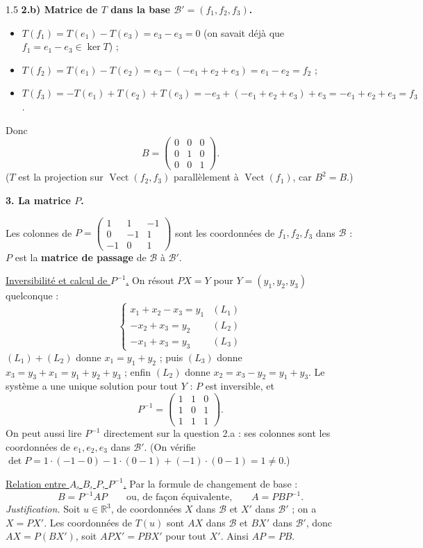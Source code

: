 \documentclass[12pt]{article}
\begin{document}
\begin{spacing}{1.5}
\textbf{2.b) Matrice de $T$ dans la base $\mathcal{B}'=(f_1,f_2,f_3)$.}
\begin{itemize}
\item $T(f_1)=T(e_1)-T(e_3)=e_3-e_3=0$ (on savait déjà que $f_1=e_1-e_3\in\ker T$) ;
\item $T(f_2)=T(e_1)-T(e_2)=e_3-(-e_1+e_2+e_3)=e_1-e_2=f_2$ ;
\item $T(f_3)=-T(e_1)+T(e_2)+T(e_3)=-e_3+(-e_1+e_2+e_3)+e_3=-e_1+e_2+e_3=f_3$.
\end{itemize}
Donc
\[
B=\begin{pmatrix}
0 & 0 & 0 \\
0 & 1 & 0 \\
0 & 0 & 1
\end{pmatrix}.
\]
($T$ est la projection sur $\operatorname{Vect}(f_2,f_3)$ parallèlement à $\operatorname{Vect}(f_1)$, car $B^2=B$.)

\textbf{3. La matrice $P$.}

Les colonnes de $P=\begin{pmatrix}1&1&-1\\0&-1&1\\-1&0&1\end{pmatrix}$ sont les coordonnées de $f_1,f_2,f_3$ dans $\mathcal{B}$ : $P$ est la \textbf{matrice de passage} de $\mathcal{B}$ à $\mathcal{B}'$.

\underline{Inversibilité et calcul de $P^{-1}$.} On résout $PX=Y$ pour $Y=(y_1,y_2,y_3)$ quelconque :
\[
\begin{cases}
x_1+x_2-x_3=y_1 & (L_1)\\
-x_2+x_3=y_2 & (L_2)\\
-x_1+x_3=y_3 & (L_3)
\end{cases}
\]
$(L_1)+(L_2)$ donne $x_1=y_1+y_2$ ; puis $(L_3)$ donne $x_3=y_3+x_1=y_1+y_2+y_3$ ; enfin $(L_2)$ donne $x_2=x_3-y_2=y_1+y_3$. Le système a une unique solution pour tout $Y$ : $P$ est inversible, et
\[
\boxed{P^{-1}=\begin{pmatrix}
1 & 1 & 0 \\
1 & 0 & 1 \\
1 & 1 & 1
\end{pmatrix}}.
\]
On peut aussi lire $P^{-1}$ directement sur la question 2.a : ses colonnes sont les coordonnées de $e_1,e_2,e_3$ dans $\mathcal{B}'$. (On vérifie $\det P=1\cdot(-1-0)-1\cdot(0-1)+(-1)\cdot(0-1)=1\neq0$.)

\underline{Relation entre $A$, $B$, $P$, $P^{-1}$.} Par la formule de changement de base :
\[
\boxed{B=P^{-1}AP\qquad\text{ou, de façon équivalente,}\qquad A=PBP^{-1}}.
\]
\emph{Justification.} Soit $u\in\mathbb{R}^3$, de coordonnées $X$ dans $\mathcal{B}$ et $X'$ dans $\mathcal{B}'$ ; on a $X=PX'$. Les coordonnées de $T(u)$ sont $AX$ dans $\mathcal{B}$ et $BX'$ dans $\mathcal{B}'$, donc $AX=P(BX')$, soit $APX'=PBX'$ pour tout $X'$. Ainsi $AP=PB$.


\end{spacing}
\end{document}
